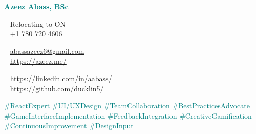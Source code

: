 \begin{minipage}[t]{1.0\textwidth}
    \begin{shaded*}
        \Huge
        \begin{minipage}[t]{\textwidth}
            \bfseries\FocusFont\textcolor{teal}{Azeez Abass, BSc}
            \raisebox{.3ex}{\Large$\cdot$ Software Engineer $\cdot$ Generalist Programmer}
        \end{minipage}
        \vspace{10pt}
        \footnotesize
        \begin{minipage}[t]{0.33\textwidth}
            \vspace{0pt} %
            \faMapMarker~ Relocating to ON \\
            \faPhone~ +1 780 720 4606 \\
        \end{minipage}
        \begin{minipage}[t]{0.33\textwidth}
            \vspace{0pt} %
            \faAt~ \url{abassazeez6@gmail.com} \\
            \faGlobe~ \url{https://azeez.me/} \\
        \end{minipage}
        \begin{minipage}[t]{0.33\textwidth}
            \vspace{0pt} %
            \faLinkedin~ \url{https://linkedin.com/in/aabass/} \\
            \faGithub~ \url{https://github.com/ducklin5/} \\
        \end{minipage}
        \vspace{-3em}
        \begin{whitebox}
            \begin{center}
            \vspace{-1.5em}
            \textcolor{teal}{
            \#ReactExpert \#UI/UXDesign \#TeamCollaboration \#BestPracticesAdvocate \#GameInterfaceImplementation \#FeedbackIntegration \#CreativeGamification \#ContinuousImprovement \#DesignInput
        }
            \vspace{-1.5em}
            \end{center}
        \end{whitebox}
        \vspace{-1em}
    \end{shaded*}
\end{minipage}\\

